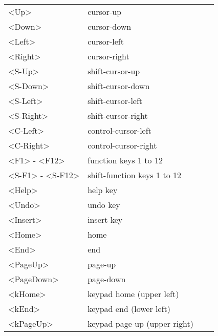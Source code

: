 \begin{description}
\begin{center}
\begin{tabularx}{\textwidth}{|l|X|l|l|}
				<Up>             & cursor-up                      &  &   \label{cursor-up} \label{cursor_up}\\
				<Down>           & cursor-down                    &  &   \label{cursor-down} \label{cursor_down}\\
				<Left>           & cursor-left                    &  &   \label{cursor-left} \label{cursor_left}\\
				<Right>          & cursor-right                   &  &   \label{cursor-right} \label{cursor_right}\\
				<S-Up>           & shift-cursor-up                &  &   \\
				<S-Down>         & shift-cursor-down              &  &   \\
				<S-Left>         & shift-cursor-left              &  &   \\
				<S-Right>        & shift-cursor-right             &  &   \\
				<C-Left>         & control-cursor-left            &  &   \\
				<C-Right>        & control-cursor-right           &  &   \\
				<F1> - <F12>     & function keys 1 to 12          &  &   \label{function_key} \label{function-key}\\
				<S-F1> - <S-F12> & shift-function keys 1 to 12    &  &   \label{<S-F1>}\\
				<Help>           & help key                       &  &   \\
				<Undo>           & undo key                       &  &   \\
				<Insert>         & insert key                     &  &   \\
				<Home>           & home                           &  &   \label{home}\\
				<End>            & end                            &  &   \label{end}\\
				<PageUp>         & page-up                        &  &   \label{page_up} \label{page-up}\\
				<PageDown>       & page-down                      &  &   \label{page_down} \label{page-down}\\
				<kHome>          & keypad home (upper left)       &  &   \label{keypad-home}\\
				<kEnd>           & keypad end (lower left)        &  &   \label{keypad-end}\\
				<kPageUp>        & keypad page-up (upper right)   &  &   \label{keypad-page-up}\\

\end{tabularx}
\end{center}
\end{description}
